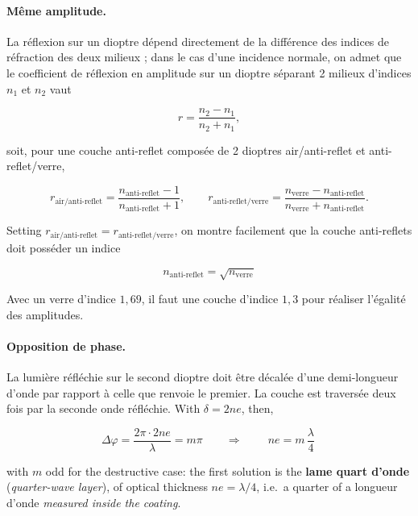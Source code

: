 \paragraph{Même amplitude.} La réflexion sur un dioptre dépend directement de la
différence des indices de réfraction des deux milieux ; dans le cas d'une
incidence normale, on admet que le coefficient de réflexion en amplitude sur un
dioptre séparant 2 milieux d'indices $n_1$ et $n_2$ vaut

\[ r = \frac{n_2 - n_1}{n_2 + n_1}, \]

soit, pour une couche anti-reflet composée de 2 dioptres air/anti-reflet et
anti-reflet/verre,

\[ r_{\text{air}/\text{anti-reflet}}
     = \frac{n_{\text{anti-reflet}} - 1}{n_{\text{anti-reflet}} + 1},
   \qquad
   r_{\text{anti-reflet}/\text{verre}}
     = \frac{n_{\text{verre}} - n_{\text{anti-reflet}}}
            {n_{\text{verre}} + n_{\text{anti-reflet}}} . \]

Setting $r_{\text{air}/\text{anti-reflet}} = r_{\text{anti-reflet}/\text{verre}}$,
on montre facilement que la couche anti-reflets doit posséder un indice

\[ \boxed{\ n_{\text{anti-reflet}} = \sqrt{n_{\text{verre}}}\ } \]

\begin{example}
  Avec un verre d'indice $1{,}69$, il faut une couche d'indice $1{,}3$ pour
  réaliser l'égalité des amplitudes.
\end{example}

\paragraph{Opposition de phase.} La lumière réfléchie sur le second dioptre doit
être décalée d'une demi-longueur d'onde par rapport à celle que renvoie le
premier. La couche est traversée deux fois par la seconde onde réfléchie. With
$\delta = 2ne$, then,

\[ \Delta\varphi = \frac{2\pi \cdot 2ne}{\lambda} = m\pi
   \qquad\Longrightarrow\qquad
   \boxed{\ ne = m\,\frac{\lambda}{4}\ } \]

with $m$ odd for the destructive case: the first solution is the
\textbf{lame quart d'onde} (\textit{quarter-wave layer}), of optical thickness
$ne = \lambda/4$, i.e.\ a quarter of a longueur
d'onde \emph{measured inside the coating}.

